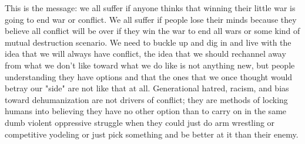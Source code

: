 This is the message: we all suffer if anyone thinks that winning their little war is going to end war or conflict. We all suffer if people lose their minds because they believe all conflict will be over if they win the war to end all wars or some kind of mutual destruction scenario. We need to buckle up and dig in and live with the idea that we will always have conflict, the idea that we should rechannel away from what we don't like toward what we do like is not anything new, but people understanding they have options and that the ones that we once thought would betray our "side" are not like that at all. Generational hatred, racism, and bias toward dehumanization are not drivers of conflict; they are methods of locking humans into believing they have no other option than to carry on in the same dumb violent oppressive struggle when they could just do arm wrestling or competitive yodeling or just pick something and be better at it than their enemy.

